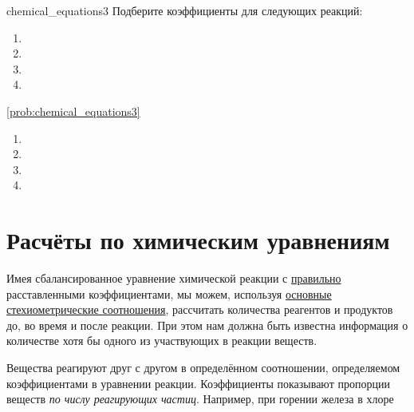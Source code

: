 \begin{problem}{}{chemical_equations3}
    Подберите коэффициенты для следующих реакций:
    \begin{enumerate}[label=\arabic*)]
        \item {}
        \item {}
        \item {}
        \item {}
    \end{enumerate}
    \begin{sol}{\ref{prob:chemical_equations3}}
        \begin{enumerate}[label=\arabic*)]
            \item {}
            \item {}
            \item {}
            \item {}
        \end{enumerate}
    \end{sol}
\end{problem}

\clearpage

\section{Расчёты по химическим уравнениям}\label{sec:calculations_based_on_chemical_equations}

Имея сбалансированное уравнение химической реакции с \hyperref[sec:setting_the_coefficients]{правильно} расставленными коэффициентами, мы можем, используя \hyperref[term:stoichiometric_relations]{основные стехиометрические соотношения}, рассчитать количества реагентов и продуктов до, во время и после реакции. При этом нам должна быть известна информация о количестве хотя бы одного из участвующих в реакции веществ.

Вещества реагируют друг с другом в определённом соотношении, определяемом коэффициентами в уравнении реакции. Коэффициенты показывают пропорции веществ \emph{по числу реагирующих частиц}. Например, при горении железа в хлоре


